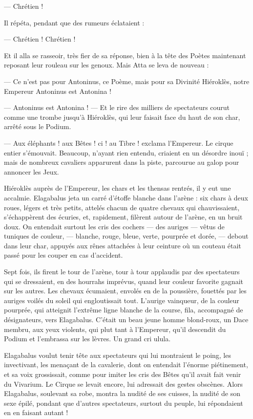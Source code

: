 \documentclass[a4paper, 11pt, oneside, polutonikogreek, french]{article}
\begin{document}
--- Chrétien !

Il répéta, pendant que des rumeurs éclataient :

--- Chrétien ! Chrétien !

Et il alla se rasseoir, très fier de sa réponse, bien à la tête des Poètes maintenant reposant leur rouleau sur les genoux. Mais Atta se leva de nouveau :

--- Ce n'est pas pour Antoninus, ce Poème, mais pour sa Divinité Hiéroklès, notre Empereur Antoninus est Antonina !

--- Antoninus est Antonina ! --- Et le rire des milliers de spectateurs courut comme une trombe jusqu'à Hiéroklès, qui leur faisait face du haut de son char, arrêté sous le Podium.

--- Aux éléphants ! aux Bêtes ! ci ! au Tibre ! exclama l'Empereur. Le cirque entier s'émouvait. Beaucoup, n'ayant rien entendu, criaient en un désordre inouï ; mais de nombreux cavaliers apparurent dans la piste, parcourue au galop pour annoncer les Jeux.

Hiéroklès auprès de l'Empereur, les chars et les thensas rentrés, il y eut une accalmie. Elagabalus jeta un carré d'étoffe blanche dans l'arène : six chars à deux roues, légers et très petits, attelés chacun de quatre chevaux qui chauvissaient, s'échappèrent des écuries, et, rapidement, filèrent autour de l'arène, en un bruit doux. On entendait surtout les cris des cochers --- des auriges --- vêtus de tuniques de couleur, --- blanche, rouge, bleue, verte, pourprée et dorée, --- debout dans leur char, appuyés aux rênes attachées à leur ceinture où un couteau était passé pour les couper en cas d'accident.

Sept fois, ils firent le tour de l'arène, tour à tour applaudis par des spectateurs qui se dressaient, en des hourrahs imprévus, quand leur couleur favorite gagnait sur les autres. Les chevaux écumaient, envolés en de la poussière, fouettés par les auriges voilés du soleil qui engloutissait tout. L'aurige vainqueur, de la couleur pourprée, qui atteignit l'extrême ligne blanche de la course, fila, accompagné de désignateurs, vers Elagabalus. C'était un beau jeune homme blond-roux, un Dace membru, aux yeux violents, qui plut tant à l'Empereur, qu'il descendit du Podium et l'embrassa sur les lèvres. Un grand cri ulula.

Elagabalus voulut tenir tête aux spectateurs qui lui montraient le poing, les invectivant, les menaçant de la cavalerie, dont on entendait l'énorme piétinement, et sa voix grossissait, comme pour imiter les cris des Bêtes qu'il avait fait venir du Vivarium. Le Cirque se levait encore, lui adressait des gestes obscènes. Alors Elagabalus, soulevant sa robe, montra la nudité de ses cuisses, la nudité de son sexe épilé, pondant que d'autres spectateurs, surtout du peuple, lui répondaient en en faisant autant !
\end{document}
